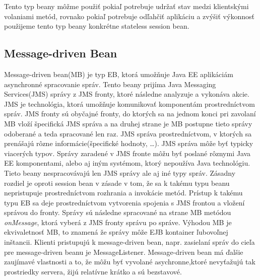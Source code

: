 Tento typ beany môžme použiť pokiaľ potrebuje udržať stav medzi klientskými volaniami metód, rovnako pokiaľ potrebuje odľahčiť aplikáciu a zvýšiť výkonnosť použijeme tento typ beany konkrétne stateless session bean. 

\subsection{Message-driven Bean}
Message-driven bean(MB) je typ EB, ktorá umožňuje Java EE aplikáciám asynchronné spracovanie správ. Tento beany prijíma Java Messaging Services(JMS) správy z JMS fronty, ktoré následne analyzuje a vykonáva akcie. JMS je technológia, ktorá umožňuje komunikovať komponentám prostredníctvom správ. JMS fronty sú obyčajné fronty, do ktorých sa na jednom konci pri zavolaní MB vloží špecifická JMS správa a na druhej strane je MB postupne tieto správy odoberané a teda spracované len raz. JMS správa prostredníctvom, v ktorých sa prenášajú rôzne informácie(špecifické hodnoty, \ldots). JMS správa môže byť typicky viacerých typov. Správy zaradené v JMS fronte môžu byť poslané rôznymi Java EE komponentami, alebo aj iným systémom, ktorý nepoužíva Java technológiu. Tieto beany nespracovávajú len JMS správy ale aj iné typy správ. Zásadny rozdiel je oproti  session bean v zásade v tom, že sa k takému  typu beanu nepristupuje prostredníctvom rozhrania a invokácie metód. Prístup k takému typu EB sa deje prostredníctvom vytvorenia spojenia s JMS frontou a vložení správou do fronty. Správy sú následne spracované na strane MB metódou \emph{onMessage}, ktorá vyberá z JMS fronty správu po správe. Výhodou MB je ekvivaletnosť MB, to znamená že správy môže EJB kontainer ľubovoľnej inštancii. Klienti pristupujú k message-driven bean, napr. zasielaní správ do cieľa pre message-driven beanu je MessageListener. Message-driven bean má ďalšie zaujímavé vlastnosti a to, že môžu byť vyvolané asychronne,ktoré nevyťažujú tak prostriedky servera, žijú relatívne krátko a sú bezstavové. 



